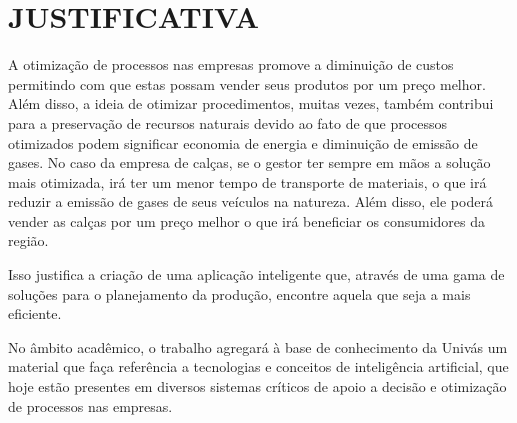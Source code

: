 \chapter{JUSTIFICATIVA}

\par A otimização de processos nas empresas promove a diminuição
de custos permitindo  com que estas possam vender seus produtos por um preço
melhor. Além disso, a ideia de otimizar procedimentos, muitas vezes, também
contribui para a preservação de recursos naturais devido ao fato de que processos otimizados
podem significar economia de energia e diminuição de emissão de gases. No
caso da empresa de calças, se o gestor ter sempre em mãos a solução mais
otimizada, irá ter um menor tempo de transporte de materiais, o que irá reduzir a emissão de gases
de seus veículos na natureza. Além disso, ele poderá vender as calças por um preço
melhor o que irá beneficiar os consumidores da região.

\par Isso justifica a criação de uma aplicação inteligente que, através de uma
gama de soluções para o planejamento da produção, encontre aquela que seja a
mais eficiente.

\par No âmbito acadêmico, o trabalho agregará à base de conhecimento da Univás
um material que faça referência a tecnologias e conceitos de inteligência
artificial, que hoje estão presentes em diversos sistemas críticos de apoio a
decisão e otimização de processos nas empresas.
